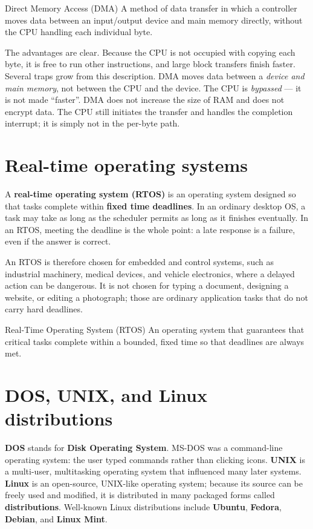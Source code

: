 \begin{definitionbox}{Direct Memory Access (DMA)}
A method of data transfer in which a controller moves data between an
input/output device and main memory directly, without the CPU handling each
individual byte.
\end{definitionbox}

The advantages are clear. Because the CPU is not occupied with copying each
byte, it is free to run other instructions, and large block transfers finish
faster. Several traps grow from this description. DMA moves data between a
\emph{device and main memory}, not between the CPU and the device. The CPU is
\emph{bypassed} --- it is not made ``faster''. DMA does not increase the size
of RAM and does not encrypt data. The CPU still initiates the transfer and
handles the completion interrupt; it is simply not in the per-byte path.

\section{Real-time operating systems}
A \textbf{real-time operating system (RTOS)} is an operating system designed
so that tasks complete within \textbf{fixed time deadlines}. In an ordinary
desktop OS, a task may take as long as the scheduler permits as long as it
finishes eventually. In an RTOS, meeting the deadline is the whole point: a
late response is a failure, even if the answer is correct.

An RTOS is therefore chosen for embedded and control systems, such as
industrial machinery, medical devices, and vehicle electronics, where a
delayed action can be dangerous. It is not chosen for typing a document,
designing a website, or editing a photograph; those are ordinary
application tasks that do not carry hard deadlines.

\begin{definitionbox}{Real-Time Operating System (RTOS)}
An operating system that guarantees that critical tasks complete within a
bounded, fixed time so that deadlines are always met.
\end{definitionbox}

\section{DOS, UNIX, and Linux distributions}
\textbf{DOS} stands for \textbf{Disk Operating System}. MS-DOS was a
command-line operating system: the user typed commands rather than clicking
icons. \textbf{UNIX} is a multi-user, multitasking operating system that
influenced many later systems. \textbf{Linux} is an open-source, UNIX-like
operating system; because its source can be freely used and modified, it is
distributed in many packaged forms called \textbf{distributions}. Well-known
Linux distributions include \textbf{Ubuntu}, \textbf{Fedora}, \textbf{Debian},
and \textbf{Linux Mint}.

